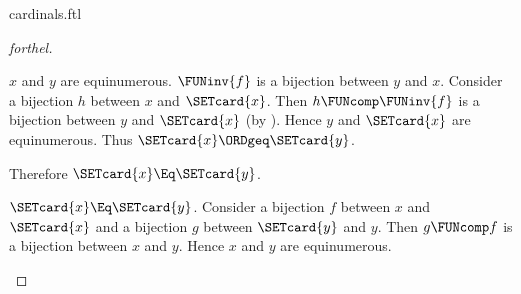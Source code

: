 \documentclass{stex}
\begin{document}
\begin{smodule}{cardinals.ftl}
\begin{proof}[forthel]
\begin{case}{$x$ and $y$ are equinumerous.}
    $\FUNinv{f}$ is a bijection between $y$ and $x$.
    Consider a bijection $h$ between $x$ and $\SETcard{x}$.
    Then $h \FUNcomp \FUNinv{f}$ is a bijection between $y$ and $\SETcard{x}$ (by ).
    Hence $y$ and $\SETcard{x}$ are equinumerous.
    Thus $\SETcard{x} \ORDgeq \SETcard{y}$.

    Therefore $\SETcard{x} \Eq \SETcard{y}$.
  \end{case}

  \begin{case}{$\SETcard{x} \Eq \SETcard{y}$.}
    Consider a bijection $f$ between $x$ and $\SETcard{x}$ and a bijection $g$
    between $\SETcard{y}$ and $y$.
    Then $g \FUNcomp f$ is a bijection between $x$ and $y$.
    Hence $x$ and $y$ are equinumerous.
  \end{case}
\end{proof}
\end{smodule}
\end{document}
